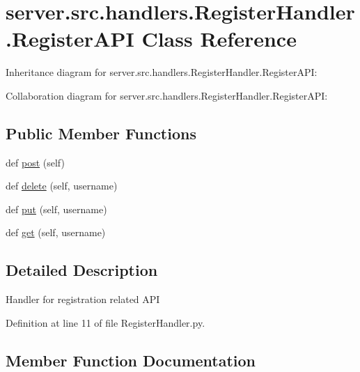 \hypertarget{classserver_1_1src_1_1handlers_1_1_register_handler_1_1_register_a_p_i}{}\section{server.\+src.\+handlers.\+Register\+Handler.\+Register\+A\+PI Class Reference}
\label{classserver_1_1src_1_1handlers_1_1_register_handler_1_1_register_a_p_i}


Inheritance diagram for server.\+src.\+handlers.\+Register\+Handler.\+Register\+A\+PI\+:


Collaboration diagram for server.\+src.\+handlers.\+Register\+Handler.\+Register\+A\+PI\+:
\subsection*{Public Member Functions}
\begin{DoxyCompactItemize}
\item 
def \hyperlink{classserver_1_1src_1_1handlers_1_1_register_handler_1_1_register_a_p_i_a0ed7d47adfdca7fb51f2f66fbeaba8c2}{post} (self)
\item 
def \hyperlink{classserver_1_1src_1_1handlers_1_1_register_handler_1_1_register_a_p_i_aad16a734d44259b03f904e1a5cf5b259}{delete} (self, username)
\item 
def \hyperlink{classserver_1_1src_1_1handlers_1_1_register_handler_1_1_register_a_p_i_a1a7e3e5e546bb99677e8e4ec7dd78c36}{put} (self, username)
\item 
def \hyperlink{classserver_1_1src_1_1handlers_1_1_register_handler_1_1_register_a_p_i_a79f861ccbc78eb373b5364d62ad1d8c3}{get} (self, username)
\end{DoxyCompactItemize}


\subsection{Detailed Description}
\begin{DoxyVerb}Handler for registration related API\end{DoxyVerb}
 

Definition at line 11 of file Register\+Handler.\+py.



\subsection{Member Function Documentation}
